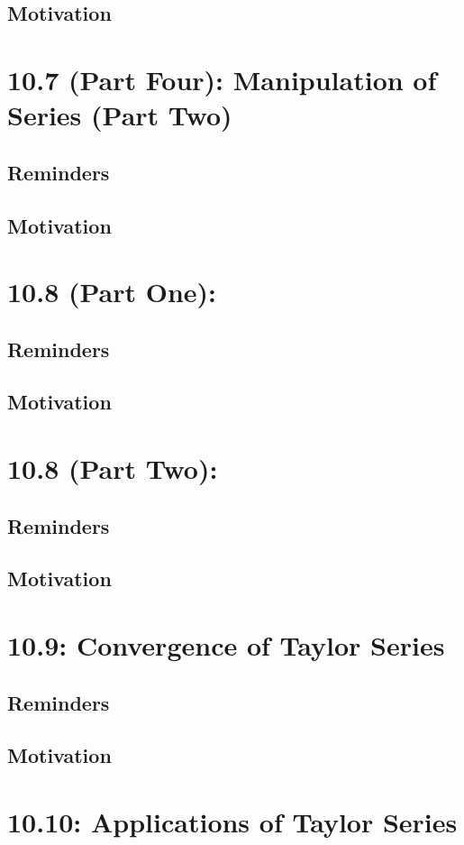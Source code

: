 \documentclass{report}
\begin{document}
\begin{sloppypar}
\section{Motivation}
\chapter{10.7 (Part Four): Manipulation of Series (Part Two)}
\section{Reminders}
\section{Motivation}
\chapter{10.8 (Part One):}
\section{Reminders}
\section{Motivation}
\chapter{10.8 (Part Two):}
\section{Reminders}
\section{Motivation}
\chapter{10.9: Convergence of Taylor Series}
\section{Reminders}
\section{Motivation}
\chapter{10.10: Applications of Taylor Series}

\end{sloppypar}
\end{document}

